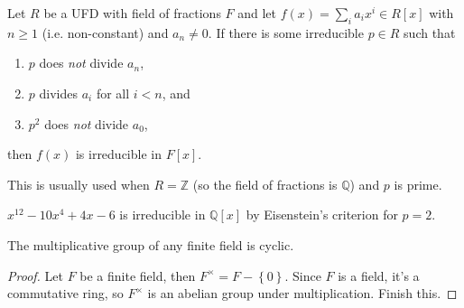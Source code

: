 \documentclass[10pt]{report}
\begin{document}
\begin{thrm}
	Let $R$ be a UFD with field of fractions $F$ and let $f(x) = \sum_i a_i x^i \in R[x]$ with $n \geq 1$ (i.e. non-constant) and $a_n \neq 0$. If there is some irreducible $p \in R$ such that
	\begin{enumerate}
		\item $p$ does \textit{not} divide $a_n$,
		\item $p$ divides $a_i$ for all $i < n$, and
		\item $p^2$ does \textit{not} divide $a_0$,
	\end{enumerate}
	then $f(x)$ is irreducible in $F[x]$.
\end{thrm}

This is usually used when $R=\mathbb{Z}$ (so the field of fractions is $\mathbb{Q}$) and $p$ is prime.

\begin{ex}[]
	$x^{12}-10x^{4}+4x-6$ is irreducible in $\mathbb{Q}[x]$ by Eisenstein's criterion for $p=2$.
\end{ex}

\begin{thrm}[]
	The multiplicative group of any finite field is cyclic.
\end{thrm}
\begin{proof}
	Let $F$ be a finite field, then $F^\times = F-\left\{ 0 \right\}$. Since $F$ is a field, it's a commutative ring, so $F^\times$ is an abelian group under multiplication. {\color{red}Finish this.}
\end{proof}
\end{document}
